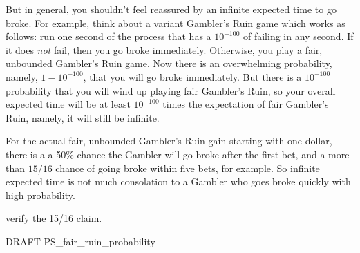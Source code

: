 But in general, you shouldn't feel reassured by an infinite expected
time to go broke.  For example, think about a variant Gambler's Ruin
game which works as follows: run one second of the process that has a
$10^{-100}$ of failing in any second.  If it does \emph{not} fail,
then you go broke immediately.  Otherwise, you play a fair, unbounded
Gambler's Ruin game.  Now there is an overwhelming probability,
namely, $1-10^{-100}$, that you will go broke immediately.  But there
is a $10^{-100}$ probability that you will wind up playing fair
Gambler's Ruin, so your overall expected time will be at least
$10^{-100}$ times the expectation of fair Gambler's Ruin, namely, it
will still be infinite.

For the actual fair, unbounded Gambler's Ruin gain starting with one
dollar, there is a a 50\% chance the Gambler will go broke after the
first bet, and a more than $15/16$ chance of going broke within five
bets, for example.  So infinite expected time is not much consolation
to a Gambler who goes broke quickly with high probability.

\begin{editingnotes}
verify the 15/16 claim.
\end{editingnotes}

\iffalse

But don't assume this means that the
gambler is \emph{likely} to play for long---there is even a 50\%
chance he will lose the very first bet and go broke right away.

In fact, if the game is unfavorable, then
Theorem~\ref{LN12:ExQthm} and Corollary~\ref{LN12:biaswincor} imply
that his expected time to go broke is essentially proportional to his
initial capital, that is, $\Theta(n)$.

Lemma~\ref{LN12:play forever} says that the gambler can ``expect'' to
play forever, while Lemma~\ref{LN12:go broke} says that he is certain
to go broke.

These facts sound contradictory, but they are sound
consequences of the technical mathematical definition of expectation.
The moral here, as in Section~\ref{infinite_expect_sec}, is that naive
intuition is unreliable when it comes to infinite expectation.

\fi

\begin{problems}
\practiceproblems
{}

\classproblems
{}

\begin{editingnotes}
\homeworkproblems
DRAFT PS\_fair\_ruin\_probability
\end{editingnotes}

\end{problems}

